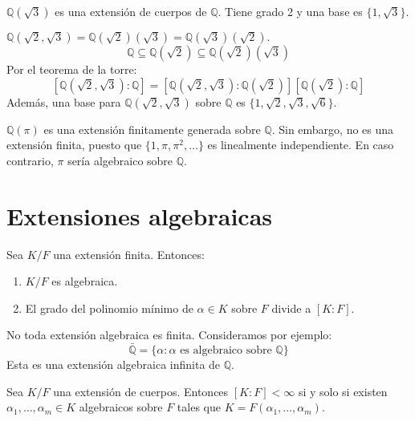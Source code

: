\begin{example}
    $\mathbb{Q}(\sqrt{3})$ es una extensión de cuerpos de $\mathbb{Q}$. Tiene grado 2 y una base es $\{ 1, \sqrt{3} \}$.
\end{example}

\begin{example}
    $\mathbb{Q}(\sqrt{2}, \sqrt{3}) = \mathbb{Q}(\sqrt{2})(\sqrt{3}) = \mathbb{Q}(\sqrt{3})(\sqrt{2}).$
    $$\mathbb{Q} \subseteq \mathbb{Q}(\sqrt{2}) \subseteq \mathbb{Q}(\sqrt{2})(\sqrt{3})$$
    Por el teorema de la torre:
    $$[\mathbb{Q}(\sqrt{2}, \sqrt{3}) : \mathbb{Q}] = [\mathbb{Q}(\sqrt{2}, \sqrt{3}) : \mathbb{Q}(\sqrt{2})] [\mathbb{Q}(\sqrt{2}) : \mathbb{Q}]$$
    Además, una base para $\mathbb{Q}(\sqrt{2}, \sqrt{3})$ sobre $\mathbb{Q}$ es $\{ 1, \sqrt{2}, \sqrt{3}, \sqrt{6} \}$.
\end{example}

\begin{example}
    $\mathbb{Q}(\pi)$ es una extensión finitamente generada sobre $\mathbb{Q}$.
    Sin embargo, no es una extensión finita, puesto que $\{ 1, \pi, \pi^2, \dots \}$ es linealmente independiente.
    En caso contrario, $\pi$ sería algebraico sobre $\mathbb{Q}$.
\end{example}

\section{Extensiones algebraicas}

\begin{proposition}
    Sea $K/F$ una extensión finita. Entonces:
    \begin{enumerate}
        \item $K/F$ es algebraica.
        \item El grado del polinomio mínimo de $\alpha \in K$ sobre $F$ divide a $[K : F]$.
    \end{enumerate}
\end{proposition}

\begin{remark}
    No toda extensión algebraica es finita. Consideramos por ejemplo:
    $$\bar{\mathbb{Q}} = \{ \alpha : \alpha \text{ es algebraico sobre } \mathbb{Q} \}$$
    Esta es una extensión algebraica infinita de $\mathbb{Q}$.
\end{remark}

\begin{proposition}
    Sea $K/F$ una extensión de cuerpos. Entonces $[K : F] < \infty$ si y solo si existen $\alpha_1, \dots, \alpha_m \in K$ algebraicos sobre $F$ tales que $K = F(\alpha_1, \dots, \alpha_m)$.
\end{proposition}


